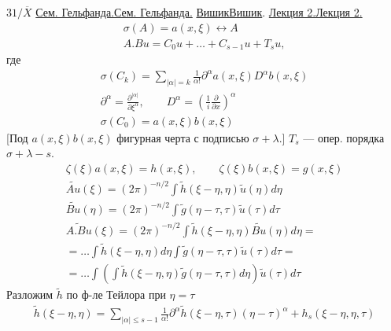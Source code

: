\documentclass[11pt]{article}
\theoremstyle{definition}
\theoremstyle{remark}
\let\DiplomaticMathUnderline\underline
\renewcommand{\underline}[1]{\ifmmode\DiplomaticMathUnderline{#1}\else\uline{#1}\fi}
\begin{document}
$31/\overline{X}$ \underline{Сем. Гельфанда.}
\underline{Вишик}. \underline{Лекция 2.}
\begin{gather*}
\sigma(A)=a(x,\xi)\longleftrightarrow A\\
A.Bu=C_0u+\ldots+C_{s-1}u+T_su,
\end{gather*}
где
\begin{gather*}
\sigma(C_k)=\sum_{|\alpha|=k}\frac{1}{\alpha!}
\partial^\alpha a(x,\xi)D^\alpha b(x,\xi)\\
\partial^\alpha=\frac{\partial^{|\alpha|}}{\partial\xi^\alpha},
\qquad D^\alpha=\left(\frac{1}{i}\frac{\partial}{\partial x}\right)^\alpha\\
\sigma(C_0)=a(x,\xi)b(x,\xi)
\end{gather*}
[Под $a(x,\xi)b(x,\xi)$ фигурная черта с подписью $\sigma+\lambda$.]
$T_s$ — опер. порядка $\sigma+\lambda-s$.
\begin{gather*}
\zeta(\xi)a(x,\xi)=h(x,\xi),\qquad
\zeta(\xi)b(x,\xi)=g(x,\xi)\\
\widetilde{Au}(\xi)=(2\pi)^{-n/2}
\int\widetilde h(\xi-\eta,\eta)\widetilde u(\eta)d\eta\\
\widetilde{Bu}(\eta)=(2\pi)^{-n/2}
\int\widetilde g(\eta-\tau,\tau)\widetilde u(\tau)d\tau\\
\widetilde{A.Bu}(\xi)=(2\pi)^{-n/2}
\int\widetilde h(\xi-\eta,\eta)\widetilde{Bu}(\eta)d\eta=\\
=\ldots\int\widetilde h(\xi-\eta,\eta)d\eta
\int\widetilde g(\eta-\tau,\tau)\widetilde u(\tau)d\tau=\\
=\ldots\int\left(\int\widetilde h(\xi-\eta,\eta)
\widetilde g(\eta-\tau,\tau)d\eta\right)\widetilde u(\tau)d\tau
\end{gather*}
Разложим $\widetilde h$ по ф-ле Тейлора при $\eta=\tau$
\begin{gather*}
\widetilde h(\xi-\eta,\eta)=
\sum_{|\alpha|\leq s-1}\frac{1}{\alpha!}
\partial^\alpha\widetilde h(\xi-\eta,\tau)(\eta-\tau)^\alpha
+h_s(\xi-\eta,\eta,\tau)
\end{gather*}
\end{document}
